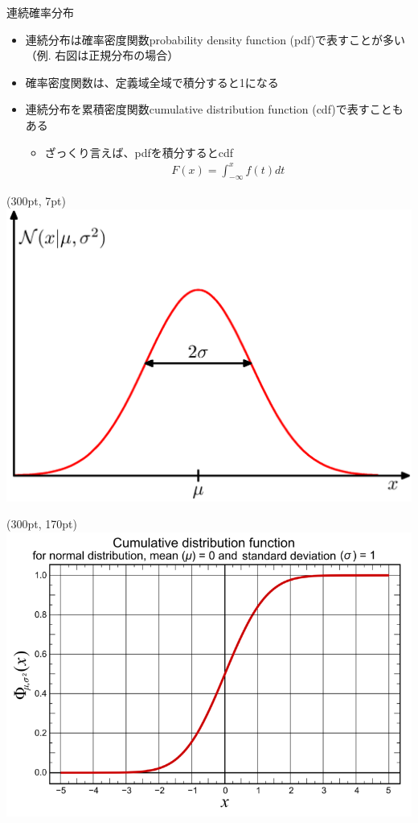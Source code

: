 \documentclass[aspectratio=169,unicode,dvipdfmx,14pt]{beamer}
\begin{document}
\begin{frame}{連続確率分布}
\vspace{.25in}
\begin{itemize}
\item 連続分布は確率密度関数probability density function (pdf)で表すことが多い（例. 右図は正規分布の場合）
\item 確率密度関数は、定義域全域で積分すると1になる
\item 連続分布を累積密度関数cumulative distribution function (cdf)で表すこともある
\begin{itemize}
\item ざっくり言えば、pdfを積分するとcdf
\begin{align}
F(x) = \int_{-\infty}^x f(t) dt
\end{align}
\end{itemize}
\end{itemize}
\begin{textblock*}{0.4\linewidth}(300pt, 7pt)
    \centering
    \includegraphics[width=0.5\linewidth]{Figure1.13.png}
\end{textblock*}
\begin{textblock*}{0.4\linewidth}(300pt, 170pt)
    \centering
    \includegraphics[width=0.6\linewidth]{800px-Cumulative_distribution_function_for_normal_distribution,_mean_0_and_sd_1.png}
\end{textblock*}
\end{frame}
\end{document}
